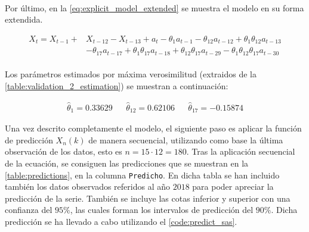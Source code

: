 \documentclass[a4paper, spanish]{article}
\begin{document}
    \paragraph{}
     Por último, en la \autoref{eq:explicit_model_extended} se muestra el modelo en su forma extendida.

    \begin{equation}
    \label{eq:explicit_model_extended}
      \begin{split}
        X_t = X_{t - 1} + &X_{t - 12} - X_{t - 13} + a_t - \theta_{1}a_{t - 1} - \theta_{12}a_{t - 12} + \theta_{1}\theta_{12}a_{t - 13} \\
        &- \theta_{17}a_{t - 17} + \theta_{1}\theta_{17}a_{t - 18} + \theta_{12}\theta_{17}a_{t - 29} - \theta_{1}\theta_{12}\theta_{17}a_{t - 30}
      \end{split}
    \end{equation}

    \paragraph{}
    Los parámetros estimados por máxima verosimilitud (extraidos de la \autoref{table:validation_2_estimation}) se muestran a continuación:

    \begin{align*}
    \label{eq:explicit_model_extended}
      \widehat{\theta}_{1} = 0.33629 &&  \widehat{\theta}_{12} = 0.62106 && \widehat{\theta}_{17} =-0.15874
    \end{align*}

    Una vez descrito completamente el modelo, el siguiente paso es aplicar la función de predicción $X_n(k)$ de manera secuencial, utilizando como base la última observación de los datos, esto es $n = 15 \cdot 12 = 180$. Tras la aplicación secuencial de la ecuación, se consiguen las predicciones que se muestran en la \autoref{table:predictions}, en la columna \texttt{Predicho}. En dicha tabla se han incluido también los datos observados referidos al año $2018$ para poder apreciar la predicción de la serie. También se incluye las cotas inferior y superior con una confianza del $95\%$, las cuales forman los intervalos de predicción del $90\%$. Dicha predicción se ha llevado a cabo utilizando el \autoref{code:predict_sas}.
\end{document}
